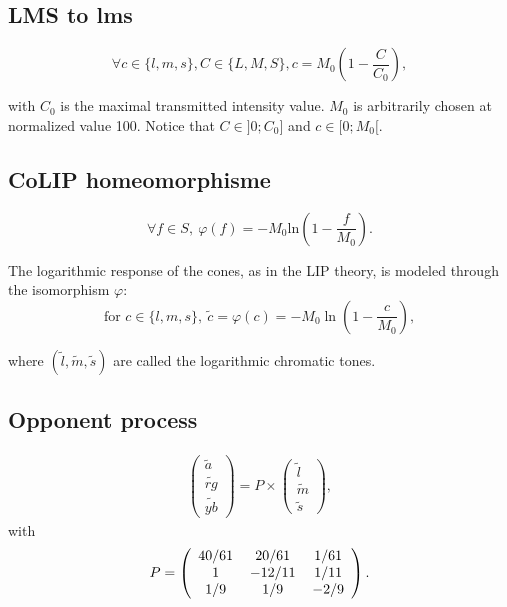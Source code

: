 \subsection{LMS to lms}\vspace*{-.8\baselineskip}

\begin{equation}
\forall c\in\{l,m,s\}, C\in\{L,M,S\}, c=M_0\left(1-\frac{C}{C_0}\right), 
\end{equation}


with $C_0$ is the maximal transmitted intensity value. $M_0$ is arbitrarily chosen at normalized value 100. Notice that $C\in]0;C_0] $ and $c\in[0;M_0[$.

\subsection{CoLIP homeomorphisme}\vspace*{-.8\baselineskip}
$$\forall f\in S, ~\varphi(f) = -M_0 \textrm{ln}\left(1-\frac{f}{M_0}\right).$$

The logarithmic response of the cones, as in the LIP theory, is modeled through the isomorphism $\varphi$:
\begin{equation}
 \textrm{for }c\in\{l,m,s\},~ \tilde{c}=\varphi(c)=-M_0\ln \left(1-\frac{c}{M_0}\right),
\end{equation}

where $(\tilde{l}, \tilde{m}, \tilde{s})$ are called the logarithmic chromatic tones. 

\subsection{Opponent process}\vspace*{-.8\baselineskip}
\begin{eqnarray}
\left(
\begin{array}{c}
\tilde{a}\\
\tilde{rg}\\
\tilde{yb}
\end{array}
\right)=
P\times
\left(
\begin{array}{c}
\tilde{l}\\
\tilde{m}\\
\tilde{s}
\end{array}
\right),
\end{eqnarray}
 with
\begin{eqnarray}
 P=\left(\begin{array}{c@{\hskip 12pt}c@{\hskip 12pt}c}
          40/61 &20/61 &1/61\\
          1     &-12/11&1/11 \\
          1/9   &1/9   &-2/9
         \end{array}
 \right).
 \label{eq:P}
\end{eqnarray}

